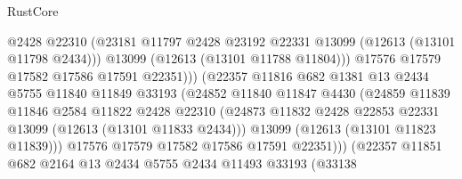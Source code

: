 \begin{lexlean}{RustCore}
\begin{coremodule}
                                    @2428
                                    @22310
                                    (@23181
                                      @11797
                                      @2428
                                      @23192
                                      @22331
                                      @13099
                                      (@12613 (@13101 @11798 @2434)))
                                    @13099
                                    (@12613 (@13101 @11788 @11804)))
                                  @17576
                                  @17579
                                  @17582
                                  @17586
                                  @17591
                                  @22351)))
                            (@22357
                              @11816
                              @682
                              @1381
                              @13
                              @2434
                              @5755
                              @11840
                              @11849
                              @33193
                              (@24852
                                @11840
                                @11847
                                @4430
                                (@24859
                                  @11839
                                  @11846
                                  @2584
                                  @11822
                                  @2428
                                  @22310
                                  (@24873
                                    @11832
                                    @2428
                                    @22853
                                    @22331
                                    @13099
                                    (@12613 (@13101 @11833 @2434)))
                                  @13099
                                  (@12613 (@13101 @11823 @11839)))
                                @17576
                                @17579
                                @17582
                                @17586
                                @17591
                                @22351)))
                          (@22357
                            @11851
                            @682
                            @2164
                            @13
                            @2434
                            @5755
                            @2434
                            @11493
                            @33193
                            (@33138

\end{coremodule}
\end{lexlean}
